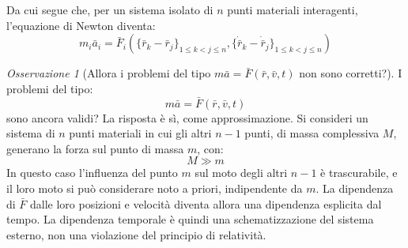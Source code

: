 \documentclass[11pt, a4paper, openright]{book}
\theoremstyle{plain}
\theoremstyle{definition}
\theoremstyle{remark}
\newtheorem{osservazione}[teorema]{Osservazione}
\begin{document}
Da cui segue che, per un sistema isolato di $n$ punti materiali interagenti, l'equazione di Newton diventa:
\begin{equation}
    m_i\bar{a}_i = \bar{F}_i\left(\{\bar{r}_k - \bar{r}_j\}_{1 \leq k < j \leq n},\{\dot{\bar{r}}_k - \dot{\bar{r}}_j\}_{1 \leq k < j \leq n}\right)
\end{equation}

\begin{osservazione}[Allora i problemi del tipo $m\bar{a} = \bar{F}(\bar{r}, \bar{v}, t)$ non sono corretti?]
    I problemi del tipo:
    \begin{equation}
        m\bar{a} = \bar{F}(\bar{r}, \bar{v}, t)
    \end{equation}
    sono ancora validi? La risposta è sì, come approssimazione. Si consideri un sistema di $n$ punti materiali in cui gli altri $n - 1$ punti, di massa complessiva $M$, generano la forza sul punto di massa $m$, con:
    \begin{equation}
        M \gg m
    \end{equation}
    In questo caso l'influenza del punto $m$ sul moto degli altri $n - 1$ è trascurabile, e il loro moto si può considerare noto a priori, indipendente da $m$. La dipendenza di $\bar{F}$ dalle loro posizioni e velocità diventa allora una dipendenza esplicita dal tempo. La dipendenza temporale è quindi una schematizzazione del sistema esterno, non una violazione del principio di relatività.
\end{osservazione}
\end{document}
